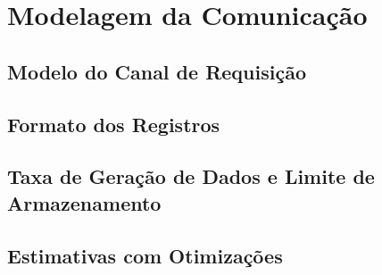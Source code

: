 \chapter{Modelagem da Comunicação} \label{ap:modelagemcan}
\section{Modelo do Canal de Requisição}
\section{Formato dos Registros}
\section{Taxa de Geração de Dados e Limite de Armazenamento}
\section{Estimativas com Otimizações}